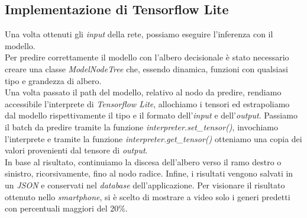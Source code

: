 \subsection{Implementazione di Tensorflow Lite}
Una volta ottenuti gli \textit{input} della rete, possiamo eseguire l'inferenza con il modello.\\ Per predire correttamente il modello con l'albero decisionale è stato necessario creare una classe \textit{ModelNodeTree} che, essendo dinamica, funzioni con qualsiasi tipo e grandezza di albero.\\
Una volta passato il path del modello, relativo al nodo da predire, rendiamo accessibile l'interprete di \textit{Tensorflow Lite}, allochiamo i tensori ed estrapoliamo dal modello rispettivamente il tipo e il formato dell'\textit{input} e dell'\textit{output}. Passiamo il batch da predire tramite la funzione \textit{interpreter.set\_tensor()}, invochiamo l'interprete e tramite la funzione \textit{interpreter.get\_tensor()} otteniamo una copia dei valori provenienti dal tensore di \textit{output}.\\
In base al risultato, continuiamo la discesa dell'albero verso il ramo destro o sinistro, ricorsivamente, fino al nodo radice.
\vspace*{2ex}
\noindent Infine, i risultati vengono salvati in un \textit{JSON} e conservati nel \textit{database} dell'applicazione.
\vspace*{2ex}
\noindent Per visionare il risultato ottenuto nello \textit{smartphone}, si è scelto di mostrare a video solo i generi predetti con percentuali maggiori del 20\%.